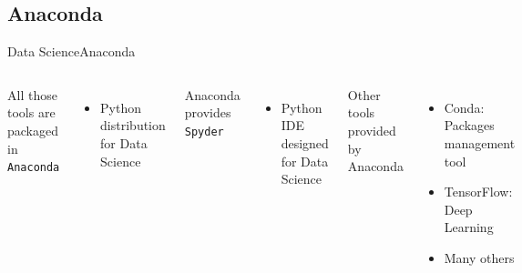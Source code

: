 \documentclass[10pt,compress]{beamer} %
\begin{document}
\subsection{Anaconda}
\begin{frame}{Data Science}{Anaconda}
    \begin{columns}
   All those tools are packaged in \texttt{Anaconda}
   \begin{itemize}
   		\item Python distribution for Data Science
	\end{itemize}

	Anaconda provides \texttt{Spyder}
	\begin{itemize}
		\item Python IDE designed for Data Science
	\end{itemize}

	Other tools provided by Anaconda
	\begin{itemize}
		\item Conda: Packages management tool
		\item TensorFlow: Deep Learning 
		\item Many others
	\end{itemize}

			\includegraphics[width=0.6\textwidth]{figs/Anaconda_Logo.png} \\\bigskip
			\includegraphics[width=0.6\textwidth]{figs/spyder.png}	
	\end{columns}
\end{frame}
\end{document}
